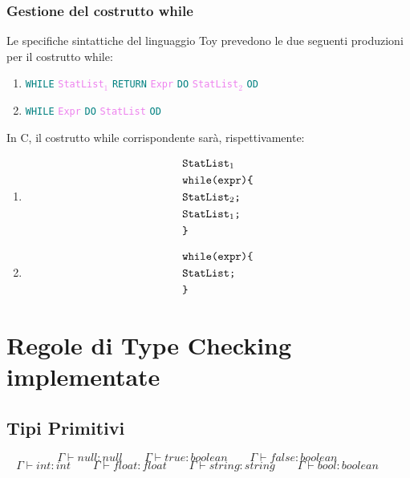 \documentclass[a4paper,12pt]{article}
\newcommand\mi[1]{\mathit{#1}}
\newcommand\nonterm[1]{\texttt{\textcolor{violet}{#1}}}
\newcommand\term[1]{\texttt{\textcolor{teal}{#1}}}
\begin{document}
	\subsubsection{Gestione del costrutto while}
	Le specifiche sintattiche del linguaggio Toy prevedono le due seguenti produzioni per il costrutto while:
	\begin{enumerate}
		\item  \term{WHILE} \nonterm{StatList$_1$} \term{RETURN} \nonterm{Expr} \term{DO} \nonterm{StatList$_2$} \term{OD} 
   		\item  \term{WHILE} \nonterm{Expr} \term{DO} \nonterm{StatList} \term{OD} 
	\end{enumerate}
	In C, il costrutto while corrispondente sarà, rispettivamente:
	\begin{enumerate}
		\item 	
			\begin{align*}
				& \text{\texttt{StatList$_1$}} \\
				& \text{\texttt{while(expr)\{}} \\
				& \text{\texttt{StatList$_{2}$;}} \\
				& \text{\texttt{StatList$_{1}$;}} \\
				& \text{\texttt{\}}} \\
			\end{align*}
		\item 	
		\begin{align*}
				& \text{\texttt{while(expr)\{}} \\
				& \text{\texttt{StatList;}} \\
				& \text{\texttt{\}}} \\
			\end{align*}
	\end{enumerate}
	
	\newpage
    \section{Regole di Type Checking implementate}\label{sec:InferenceRules}
    \subsection{Tipi Primitivi}
    \[
        \Gamma \vdash null \colon null \qquad
        \Gamma \vdash true \colon boolean \qquad
        \Gamma \vdash false \colon boolean \qquad
    \]
    \[
        \Gamma \vdash \mi{int} \colon int \qquad
        \Gamma \vdash \mi{float} \colon float \qquad
        \Gamma \vdash \mi{string} \colon string \qquad
        \Gamma \vdash \mi{bool}    \colon boolean \qquad
    \]
\end{document}
